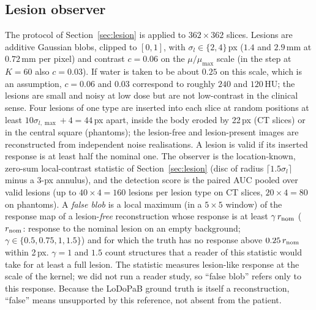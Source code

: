 \subsection{Lesion observer}\label{sec:observer3}
The protocol of Section~\ref{sec:lesion} is applied to $362\times362$ slices. Lesions are additive Gaussian blobs, clipped to $[0,1]$, with $\sigma_l\in\{2,4\}$\,px ($1.4$ and $2.9$\,mm at $0.72$\,mm per pixel) and contrast $c=0.06$ on the $\mu/\mu_{\max}$ scale
(in the step at $K=60$ also $c=0.03$). If water is taken to be about $0.25$ on this scale, which is an assumption, $c=0.06$ and $0.03$ correspond to roughly $240$ and $120$\,HU; the lesions are small and noisy at low dose but are not low-contrast in the clinical sense.
Four lesions of one type are inserted into each slice at random positions at least $10\sigma_{l,\max}+4=44$\,px apart, inside the body eroded by 22\,px (CT slices) or in the central square (phantoms); the lesion-free and lesion-present images are reconstructed from independent noise realisations.
A lesion is valid if its inserted response is at least half the nominal one. The observer is the location-known, zero-sum local-contrast statistic of Section~\ref{sec:lesion} (disc of radius $\lceil1.5\sigma_l\rceil$ minus a 3-px annulus), and the detection score is the paired AUC pooled over valid lesions (up to $40\times4=160$ lesions per lesion type on CT slices, $20\times4=80$ on phantoms).
A \emph{false blob} is a local maximum (in a $5\times5$ window) of the response map of a lesion-\emph{free} reconstruction whose response is at least $\gamma\,r_{\rm nom}$ ($r_{\rm nom}$: response to the nominal lesion on an empty background; $\gamma\in\{0.5,0.75,1,1.5\}$) and for which the truth has no response above $0.25\,r_{\rm nom}$ within 2\,px.
$\gamma=1$ and $1.5$ count structures that a reader of this statistic would take for at least a full lesion. The statistic measures lesion-like response at the scale of the kernel; we did not run a reader study, so ``false blob'' refers only to this response. Because the LoDoPaB ground truth is itself a reconstruction, ``false'' means unsupported by this reference, not absent from the patient.

